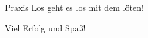 \begin{frame}{Praxis}
    \centering
    {\LARGE Los geht es los mit dem löten!}\par\vspace{3mm}
    Viel Erfolg und Spaß!\par\vspace{5mm}
\end{frame}